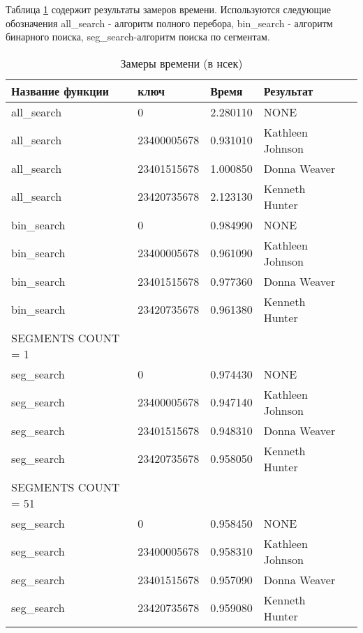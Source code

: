 Таблица \ref{tab:resulttime} содержит результаты замеров времени.
 Используются следующие обозначения all\_search - алгоритм полного перебора,
 bin\_search - алгоритм бинарного поиска, seg\_search-алгоритм поиска по сегментам.


\begin{table}[ht]
    \caption{Замеры времени (в нсек)}
    \centering
\begin{tabular}{ l | l | l | l | l | }  
    Название функции&         ключ&         Время&          Результат\\\hline\hline

    all\_search&            0&               2.280110&         NONE\\ 
    all\_search&  23400005678&             0.931010&Kathleen Johnson\\
    all\_search&  23401515678&              1.000850& Donna Weaver\\
    all\_search&  23420735678&              2.123130&Kenneth Hunter\\\hline
    
    bin\_search&            0&               0.984990&         NONE\\
    bin\_search&  23400005678&            0.961090&Kathleen Johnson\\
    bin\_search&  23401515678&           0.977360& Donna Weaver\\
    bin\_search&  23420735678&            0.961380&Kenneth Hunter\\\hline
    SEGMENTS COUNT =  1\\
    seg\_search&            0&             0.974430&         NONE\\
    seg\_search&  23400005678&            0.947140&Kathleen Johnson\\
    seg\_search&  23401515678&             0.948310& Donna Weaver\\
    seg\_search&  23420735678&          0.958050&Kenneth Hunter\\\hline
    SEGMENTS COUNT =  51\\
    seg\_search&            0&            0.958450&         NONE\\
    seg\_search&  23400005678&             0.958310&Kathleen Johnson\\
    seg\_search&  23401515678&           0.957090& Donna Weaver\\
    seg\_search&  23420735678&          0.959080&Kenneth Hunter\\ \hline
 
\end{tabular}
\label{tab:resulttime}
\end{table}



